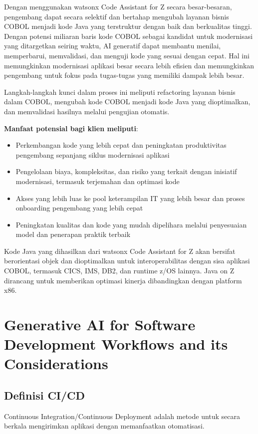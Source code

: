 \documentclass{article}
\begin{document}
Dengan menggunakan watsonx Code Assistant for Z secara besar-besaran, pengembang dapat secara selektif dan bertahap mengubah layanan bisnis COBOL menjadi kode Java yang terstruktur dengan baik dan berkualitas tinggi. Dengan potensi miliaran baris kode COBOL sebagai kandidat untuk modernisasi yang ditargetkan seiring waktu, AI generatif dapat membantu menilai, memperbarui, memvalidasi, dan menguji kode yang sesuai dengan cepat. Hal ini memungkinkan modernisasi aplikasi besar secara lebih efisien dan memungkinkan pengembang untuk fokus pada tugas-tugas yang memiliki dampak lebih besar.

Langkah-langkah kunci dalam proses ini meliputi refactoring layanan bisnis dalam COBOL, mengubah kode COBOL menjadi kode Java yang dioptimalkan, dan memvalidasi hasilnya melalui pengujian otomatis.

\textbf{Manfaat potensial bagi klien meliputi}:
\begin{itemize}
    \item Perkembangan kode yang lebih cepat dan peningkatan produktivitas pengembang sepanjang siklus modernisasi aplikasi
    \item Pengelolaan biaya, kompleksitas, dan risiko yang terkait dengan inisiatif modernisasi, termasuk terjemahan dan optimasi kode
    \item Akses yang lebih luas ke pool keterampilan IT yang lebih besar dan proses onboarding pengembang yang lebih cepat
    \item Peningkatan kualitas dan kode yang mudah dipelihara melalui penyesuaian model dan penerapan praktik terbaik
\end{itemize}
Kode Java yang dihasilkan dari watsonx Code Assistant for Z akan bersifat berorientasi objek dan dioptimalkan untuk interoperabilitas dengan sisa aplikasi COBOL, termasuk CICS, IMS, DB2, dan runtime z/OS lainnya. Java on Z dirancang untuk memberikan optimasi kinerja dibandingkan dengan platform x86.

\newpage

\section{Generative AI for Software Development Workflows and its Considerations}

\subsection{Definisi CI/CD}
Continuous Integration/Continuous Deployment adalah metode untuk secara berkala mengirimkan aplikasi dengan memanfaatkan otomatisasi.
\end{document}
